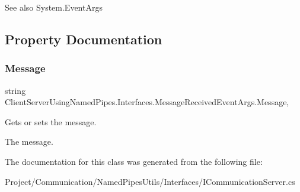 \begin{DoxySeeAlso}{See also}
System.\+Event\+Args


\end{DoxySeeAlso}


\subsection{Property Documentation}
\mbox{\label{class_client_server_using_named_pipes_1_1_interfaces_1_1_message_received_event_args_abf95715ee9354dc8f891b9917c00e5e4}} 
\subsubsection{\texorpdfstring{Message}{Message}}
{\footnotesize\ttfamily string Client\+Server\+Using\+Named\+Pipes.\+Interfaces.\+Message\+Received\+Event\+Args.\+Message\hspace{0.3cm}{\ttfamily [get]}, {\ttfamily [set]}}



Gets or sets the message. 

The message.

The documentation for this class was generated from the following file\+:\begin{DoxyCompactItemize}
\item 
Project/\+Communication/\+Named\+Pipes\+Utils/\+Interfaces/I\+Communication\+Server.\+cs\end{DoxyCompactItemize}
